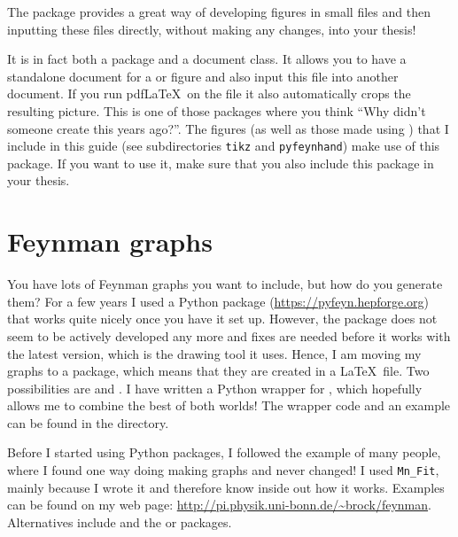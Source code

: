 The  package provides a great way of developing
figures in small files and then inputting these files directly,
without making any changes, into your thesis!

It is in fact both a package and a document class.
It allows you to have a
standalone document for a \Package{\TikZ} or  figure
and also input this file into another document. If you run pdf\LaTeX\
on the file it also automatically crops the resulting picture. This is
one of those packages where you think
\enquote{Why didn't someone create this years ago?}.
The \TikZ figures (as well as those made using )
that I include in this guide (see subdirectories \texttt{tikz} and \texttt{pyfeynhand})
make use of this package.
If you want to use it, make sure that you also include this package in
your thesis.


\section{Feynman graphs}%
\label{sec:fig:feynman}

You have lots of Feynman graphs you want to include, but how do you
generate them? 
For a few years I used a Python package  (\url{https://pyfeyn.hepforge.org})
that works quite nicely once you have it set up.
However, the package does not seem to be actively developed any more
and fixes are needed before it works with the latest \Package{PyX} version,
which is the drawing tool it uses.
Hence, I am moving my graphs to a \TikZ package, which means that they are created in a \LaTeX\ file.
Two possibilities are \Package{TikZ-Feynman} and .
I have written a Python wrapper for \Package{TikZ-FeynHand},
which hopefully allows me to combine the best of both worlds!
The wrapper code and an example can be found in the  directory.

Before I started using Python packages, I followed the example of many people,
where I found one way doing making graphs and never changed!
I used \texttt{Mn\_Fit},
mainly because I wrote it and therefore know inside out how it works.
Examples can be found on my web page:
\url{http://pi.physik.uni-bonn.de/~brock/feynman}.
Alternatives include  and the  or
\Package{feynmp} packages.

